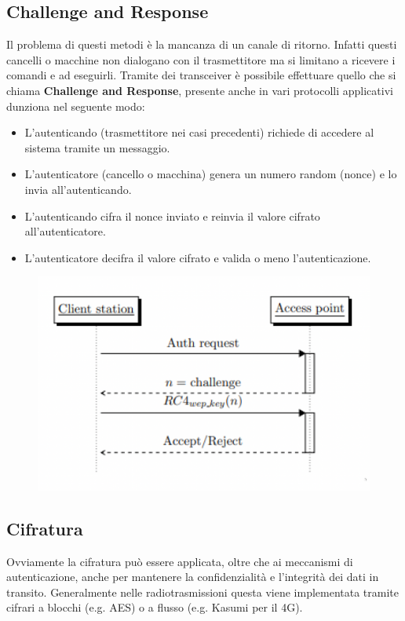 \subsection{Challenge and Response}
Il problema di questi metodi è la mancanza di un canale di ritorno. Infatti questi cancelli o macchine non dialogano con il trasmettitore ma si limitano a ricevere i comandi e ad eseguirli.
Tramite dei transceiver è possibile effettuare quello che si chiama \textbf{Challenge and Response}, presente anche in vari protocolli applicativi dunziona nel seguente modo:
\begin{itemize}
    \item L’autenticando (trasmettitore nei casi precedenti) richiede di accedere al sistema tramite un messaggio.
    \item L’autenticatore (cancello o macchina) genera un numero random (nonce) e lo invia all’autenticando.
    \item L’autenticando cifra il nonce inviato e reinvia il valore cifrato all’autenticatore.
    \item L’autenticatore decifra il valore cifrato e valida o meno l’autenticazione.
\end{itemize}
\begin{figure}[h!]
    \centering
    \includegraphics[width=.8\linewidth]{res/challenge_and_response.png}
    \caption{}
\end{figure}

\subsection{Cifratura}
Ovviamente la cifratura può essere applicata, oltre che ai meccanismi di autenticazione, anche per mantenere la confidenzialità e l'integrità dei dati in transito. Generalmente nelle radiotrasmissioni questa viene implementata tramite cifrari a blocchi (e.g. AES) o a flusso (e.g. Kasumi per il 4G).

